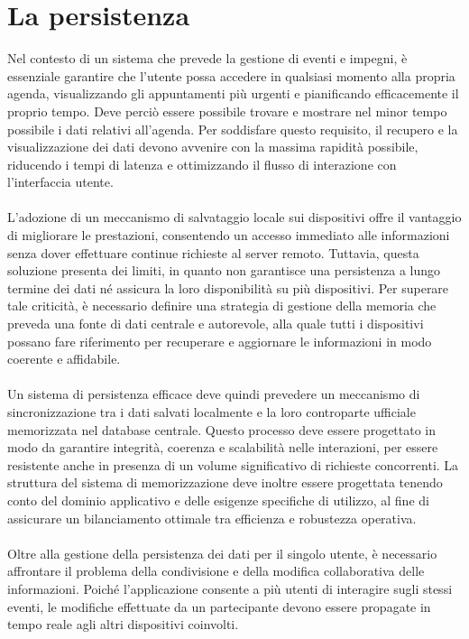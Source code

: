 \section{ La persistenza}

Nel contesto di un sistema che prevede la gestione di eventi e impegni, è essenziale garantire che l’utente possa accedere in qualsiasi momento alla propria agenda, 
visualizzando gli appuntamenti più urgenti e pianificando efficacemente il proprio tempo. 
Deve perciò essere possibile trovare e mostrare nel minor tempo possibile i dati relativi all’agenda. 
Per soddisfare questo requisito, il recupero e la visualizzazione dei dati devono avvenire con la massima rapidità possibile, 
riducendo i tempi di latenza e ottimizzando il flusso di interazione con l’interfaccia utente. \\
\\
L’adozione di un meccanismo di salvataggio locale sui dispositivi offre il vantaggio di migliorare le prestazioni, 
consentendo un accesso immediato alle informazioni senza dover effettuare continue richieste al server remoto. 
Tuttavia, questa soluzione presenta dei limiti, in quanto non garantisce una persistenza a lungo termine dei dati né assicura la loro disponibilità su più dispositivi. 
Per superare tale criticità, è necessario definire una strategia di gestione della memoria che preveda una fonte di dati centrale e autorevole, 
alla quale tutti i dispositivi possano fare riferimento per recuperare e aggiornare le informazioni in modo coerente e affidabile.\\
\\
Un sistema di persistenza efficace deve quindi prevedere un meccanismo di sincronizzazione tra i dati salvati localmente e la loro controparte ufficiale memorizzata nel database centrale. 
Questo processo deve essere progettato in modo da garantire integrità, coerenza e scalabilità nelle interazioni, 
per essere resistente anche in presenza di un volume significativo di richieste concorrenti. 
La struttura del sistema di memorizzazione deve inoltre essere progettata tenendo conto del dominio applicativo e delle esigenze specifiche di utilizzo, 
al fine di assicurare un bilanciamento ottimale tra efficienza e robustezza operativa.\\
\\
Oltre alla gestione della persistenza dei dati per il singolo utente, è necessario affrontare il problema della condivisione e della modifica collaborativa delle informazioni. 
Poiché l’applicazione consente a più utenti di interagire sugli stessi eventi, le modifiche effettuate da un partecipante devono essere propagate in tempo reale agli altri dispositivi coinvolti. 

